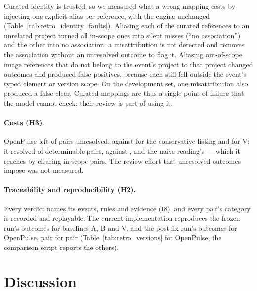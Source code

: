 \documentclass[11pt]{article}
\begin{document}


Curated identity is trusted, so we measured what a wrong mapping costs by
injecting one explicit alias per reference, with the engine unchanged
(Table~\ref{tab:retro_identity_faults}). Aliasing each of the \FaultMis{}
curated references to an unrelated project turned all \FaultMisMiss{}
in-scope ones into silent misses (``no association'') and the other
\FaultMisNoAssoc{} into no association: a misattribution is not detected and
removes the association without an unresolved outcome to flag it. Aliasing
\FaultCol{} out-of-scope image references that do not belong to the event's
project to that project changed \FaultColChanged{} outcomes and produced
\FaultColFP{} false positives, because each still fell outside the event's
typed element or version scope. On the development set, one misattribution
also produced a false clear. Curated mappings are thus a single point of
failure that the model cannot check; their review is part of using it.



\paragraph{Costs (H3).} OpenPulse left \UnresC{} of \RetroPairs{} pairs
unresolved, against \UnresB{} for the conservative listing and \UnresV{} for
V; it resolved \ResC{} of \RetroDeterminable{} determinable pairs, against
\ResB{}, \ResV{} and the naive reading's \ResA{} --- which it reaches by
clearing in-scope pairs. The review effort that unresolved outcomes impose was
not measured.

\paragraph{Traceability and reproducibility (H2).} Every verdict names its
events, rules and evidence (I8), and every pair's category is recorded and
replayable. The current implementation reproduces the frozen run's outcomes
for baselines A, B and V, and the post-fix run's outcomes for OpenPulse, pair
for pair (Table~\ref{tab:retro_versions} for OpenPulse; the comparison script
reports the others).



\section{Discussion}
\end{document}
